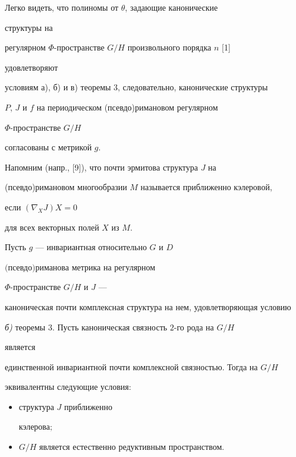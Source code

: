  


Легко видеть, что полиномы от $\theta$, задающие канонические 


структуры на 


регулярном $\Phi$-пространстве $G/H$ произвольного порядка $n$ [1] 


удовлетворяют 


условиям а), б) и в) теоремы 3, следовательно, канонические структуры 


$P$, $J$ и $f$ на периодическом (псевдо)римановом регулярном 


$\Phi$-пространстве $G/H$ 


согласованы с метрикой $g$. 


 


Напомним (напр., [9]), что почти эрмитова структура $J$ на 


(псевдо)римановом многообразии $M$ называется приближенно кэлеровой, 


если $(\nabla_XJ)X=0$ 


для всех векторных полей $X$ из $M$. 


 


\begin{thm} Пусть $g$ --- инвариантная относительно $G$ и $D$ 


$($псевдо$)$риманова метрика на регулярном 


$\Phi$-пространстве $G/H$ и $J$ --- 


каноническая почти комплексная структура на нем, удовлетворяющая условию 


{\em б)} теоремы $3$. Пусть каноническая связность $2$-го рода на $G/H$


является 


единственной инвариантной почти комплексной связностью. Тогда на $G/H$ 


эквивалентны следующие условия$:$ 


\begin{itemize} 


\item[1)] структура $J$ приближенно 


кэлерова$;$ 


\item[2)] $G/H$ является естественно редуктивным пространством. 


\end{itemize} 


\end{thm} 



